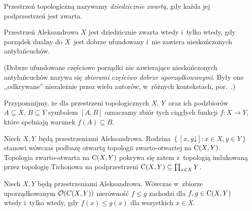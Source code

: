 Przestrzeń topologiczną nazywamy \textit{dziedzicznie zwartą}, gdy każda jej podprzestrzeń jest zwarta.

\begin{stw}
Przestrzeń Aleksandrowa $X$ jest dziedzicznie zwarta wtedy i~tylko wtedy, gdy porządek dualny do $X$~jest dobrze ufundowany i~nie zawiera nieskończonych antyłańcuchów.
\end{stw}

(Dobrze ufundowane częściowe porządki nie zawierające nieskończonych antyłańcuchów nazywa się \textit{zbiorami częściwo dobrze uporządkowanymi}. Były one ,,odkrywane'' niezależnie przez wielu autorów, w~różnych kontekstach, por.~\cite{Kruskal72}.)

Przypomnijmy, że dla przestrzeni topologicznych $X$, $Y$~oraz ich podzbiorów $A\subseteq X$, $B\subseteq Y$ symbolem $[A,B]$ oznaczamy zbiór tych ciągłych funkcji $f\colon X\to Y$, które spełniają warunek $f(A)\subseteq B$.

\begin{stw}
Niech $X, Y$~będą przestrzeniami Aleksandrowa. Rodzina $\left\{[x,y\mathord{\downarrow}]:x\in X,y\in Y\right\}$ stanowi wówczas podbazę otwartą topologii zwarto-otwartej na $\operatorname{C}(X,Y)$. Topologia zwarto-otwarta na $\operatorname{C}(X,Y)$ pokrywa się zatem z~topologią indukowaną przez topologię Tichonowa na podprzestrzeni $\operatorname{C}(X,Y)\subseteq \prod_{x\in X}Y$.
\end{stw}

\begin{stw}\label{stw-porzadek_na_cxy}
Niech $X,Y$ będą przestrzeniami Aleksandrowa. Wówczas w~zbiorze uporządkowanym $\mathcal{O}(C(X,Y))$ nierówność $f\leq g$ zachodzi dla $f,g\in \operatorname{C}(X,Y)$ wtedy i~tylko wtedy, gdy $f(x)\leq g(x)$ dla wszystkich $x\in X$.
\end{stw}

